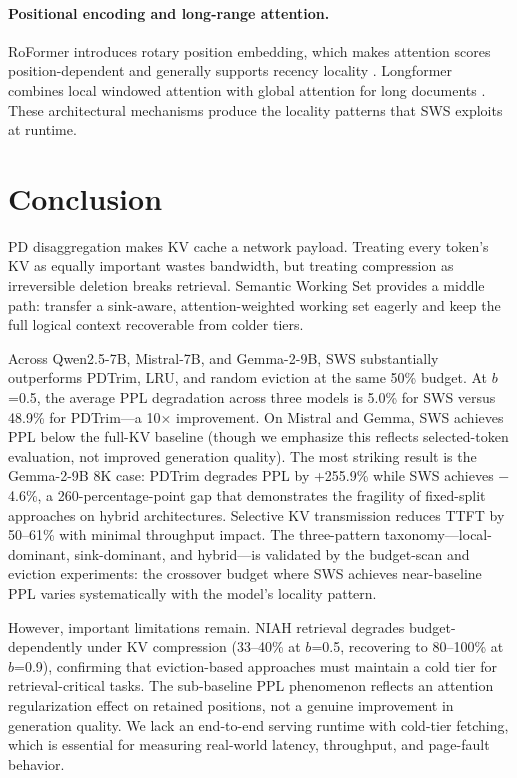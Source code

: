 \documentclass[11pt]{article}
\newcommand{\method}{SWS}
\newcommand{\fullmethod}{Semantic Working Set}
\newcommand{\sws}{SWS}
\newcommand{\pct}{\%}
\theoremstyle{definition}
\theoremstyle{plain}
\begin{document}
\paragraph{Positional encoding and long-range attention.}
RoFormer introduces rotary position embedding, which makes attention scores position-dependent and generally supports recency locality \citep{su2021roformer}.  Longformer combines local windowed attention with global attention for long documents \citep{longformer}.  These architectural mechanisms produce the locality patterns that \method{} exploits at runtime.

\section{Conclusion}
\label{sec:conclusion}

PD disaggregation makes KV cache a network payload.  Treating every token's KV as equally important wastes bandwidth, but treating compression as irreversible deletion breaks retrieval.  \fullmethod{} provides a middle path: transfer a sink-aware, attention-weighted working set eagerly and keep the full logical context recoverable from colder tiers.

Across Qwen2.5-7B, Mistral-7B, and Gemma-2-9B, \method{} substantially outperforms PDTrim, LRU, and random eviction at the same 50\pct{} budget.  At $b$=0.5, the average PPL degradation across three models is 5.0\pct{} for \sws{} versus 48.9\pct{} for PDTrim---a 10$\times$ improvement.  On Mistral and Gemma, \sws{} achieves PPL below the full-KV baseline (though we emphasize this reflects selected-token evaluation, not improved generation quality).  The most striking result is the Gemma-2-9B 8K case: PDTrim degrades PPL by +255.9\pct{} while \sws{} achieves $-$4.6\pct{}, a 260-percentage-point gap that demonstrates the fragility of fixed-split approaches on hybrid architectures.  Selective KV transmission reduces TTFT by 50--61\pct{} with minimal throughput impact.  The three-pattern taxonomy---local-dominant, sink-dominant, and hybrid---is validated by the budget-scan and eviction experiments: the crossover budget where \sws{} achieves near-baseline PPL varies systematically with the model's locality pattern.

However, important limitations remain.  NIAH retrieval degrades budget-dependently under KV compression (33--40\pct{} at $b$=0.5, recovering to 80--100\pct{} at $b$=0.9), confirming that eviction-based approaches must maintain a cold tier for retrieval-critical tasks.  The sub-baseline PPL phenomenon reflects an attention regularization effect on retained positions, not a genuine improvement in generation quality.  We lack an end-to-end serving runtime with cold-tier fetching, which is essential for measuring real-world latency, throughput, and page-fault behavior.
\end{document}
